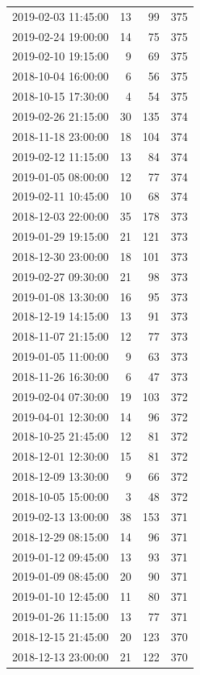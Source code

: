 \begin{tabular}{lrrr}
2019-02-03 11:45:00 & 13 & 99 & 375 \\
2019-02-24 19:00:00 & 14 & 75 & 375 \\
2019-02-10 19:15:00 & 9 & 69 & 375 \\
2018-10-04 16:00:00 & 6 & 56 & 375 \\
2018-10-15 17:30:00 & 4 & 54 & 375 \\
2019-02-26 21:15:00 & 30 & 135 & 374 \\
2018-11-18 23:00:00 & 18 & 104 & 374 \\
2019-02-12 11:15:00 & 13 & 84 & 374 \\
2019-01-05 08:00:00 & 12 & 77 & 374 \\
2019-02-11 10:45:00 & 10 & 68 & 374 \\
2018-12-03 22:00:00 & 35 & 178 & 373 \\
2019-01-29 19:15:00 & 21 & 121 & 373 \\
2018-12-30 23:00:00 & 18 & 101 & 373 \\
2019-02-27 09:30:00 & 21 & 98 & 373 \\
2019-01-08 13:30:00 & 16 & 95 & 373 \\
2018-12-19 14:15:00 & 13 & 91 & 373 \\
2018-11-07 21:15:00 & 12 & 77 & 373 \\
2019-01-05 11:00:00 & 9 & 63 & 373 \\
2018-11-26 16:30:00 & 6 & 47 & 373 \\
2019-02-04 07:30:00 & 19 & 103 & 372 \\
2019-04-01 12:30:00 & 14 & 96 & 372 \\
2018-10-25 21:45:00 & 12 & 81 & 372 \\
2018-12-01 12:30:00 & 15 & 81 & 372 \\
2018-12-09 13:30:00 & 9 & 66 & 372 \\
2018-10-05 15:00:00 & 3 & 48 & 372 \\
2019-02-13 13:00:00 & 38 & 153 & 371 \\
2018-12-29 08:15:00 & 14 & 96 & 371 \\
2019-01-12 09:45:00 & 13 & 93 & 371 \\
2019-01-09 08:45:00 & 20 & 90 & 371 \\
2019-01-10 12:45:00 & 11 & 80 & 371 \\
2019-01-26 11:15:00 & 13 & 77 & 371 \\
2018-12-15 21:45:00 & 20 & 123 & 370 \\
2018-12-13 23:00:00 & 21 & 122 & 370 \\

\end{tabular}
